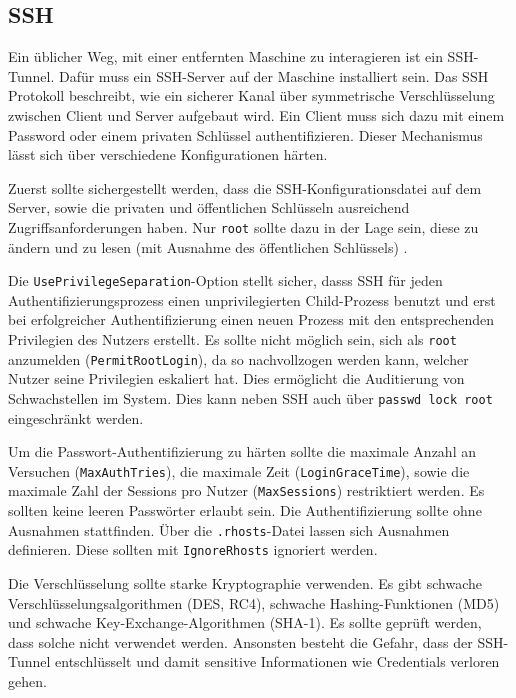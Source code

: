 \subsection{SSH}

Ein üblicher Weg, mit einer entfernten Maschine zu interagieren ist ein SSH-Tunnel. Dafür muss ein SSH-Server auf der Maschine installiert sein. Das SSH Protokoll beschreibt, wie ein sicherer Kanal über symmetrische Verschlüsselung zwischen Client und Server aufgebaut wird. Ein Client muss sich dazu mit einem Password oder einem privaten Schlüssel authentifizieren. Dieser Mechanismus lässt sich über verschiedene Konfigurationen härten.

Zuerst sollte sichergestellt werden, dass die SSH-Konfigurationsdatei auf dem Server, sowie die privaten und öffentlichen Schlüsseln ausreichend Zugriffsanforderungen haben. Nur \texttt{root} sollte dazu in der Lage sein, diese zu ändern und zu lesen (mit Ausnahme des öffentlichen Schlüssels) \cite{cis}. 

Die \texttt{UsePrivilegeSeparation}-Option stellt sicher, dasss SSH für jeden Authentifizierungsprozess einen unprivilegierten Child-Prozess benutzt und erst bei erfolgreicher Authentifizierung einen neuen Prozess mit den entsprechenden Privilegien des Nutzers erstellt.
Es sollte nicht möglich sein, sich als \texttt{root} anzumelden (\texttt{PermitRootLogin}), da so nachvollzogen werden kann, welcher Nutzer seine Privilegien eskaliert hat. Dies ermöglicht die Auditierung von Schwachstellen im System. Dies kann neben SSH auch über \texttt{passwd \-\-lock root} eingeschränkt werden.

Um die Passwort-Authentifizierung zu härten sollte die maximale Anzahl an Versuchen (\texttt{MaxAuthTries}), die maximale Zeit (\texttt{LoginGraceTime}), sowie die maximale Zahl der Sessions pro Nutzer (\texttt{MaxSessions}) restriktiert werden. Es sollten keine leeren Passwörter erlaubt sein.
Die Authentifizierung sollte ohne Ausnahmen stattfinden. Über die \texttt{.rhosts}-Datei lassen sich Ausnahmen definieren. Diese sollten mit \texttt{IgnoreRhosts} ignoriert werden.

Die Verschlüsselung sollte starke Kryptographie verwenden. Es gibt schwache Verschlüsselungsalgorithmen (DES, RC4), schwache Hashing-Funktionen (MD5) und schwache Key-Exchange-Algorithmen (SHA-1). Es sollte geprüft werden, dass solche nicht verwendet werden. Ansonsten besteht die Gefahr, dass der SSH-Tunnel entschlüsselt und damit sensitive Informationen wie Credentials verloren gehen.

